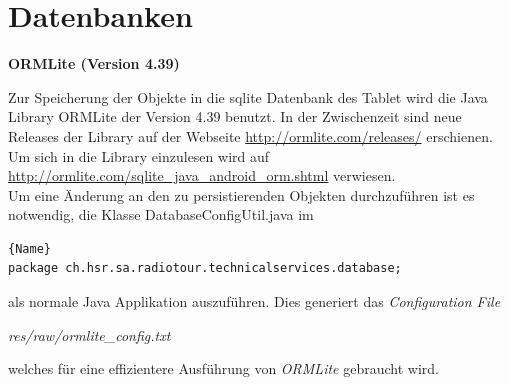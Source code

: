 \section{Datenbanken}
\textbf{ORMLite (Version 4.39)}

 
Zur Speicherung der Objekte in die \gls{sqlite} Datenbank des Tablet wird die Java Library ORMLite der Version 4.39 benutzt. In der Zwischenzeit sind neue Releases der Library auf der Webseite \url{http://ormlite.com/releases/} erschienen. Um sich in die Library einzulesen wird auf \url{http://ormlite.com/sqlite_java_android_orm.shtml} verwiesen.
\\
Um eine Änderung an den zu persistierenden Objekten durchzuführen ist es notwendig, die Klasse DatabaseConfigUtil.java im

\begin{lstlisting}{Name}
package ch.hsr.sa.radiotour.technicalservices.database;
\end{lstlisting}

als normale Java Applikation auszuführen. Dies generiert das \textit{Configuration File}

\textit{res/raw/ormlite\_config.txt}

welches für eine effizientere Ausführung von \textit{ORMLite} gebraucht wird.



